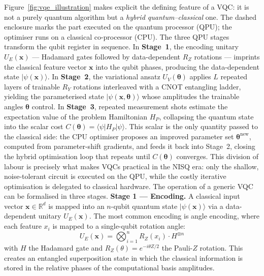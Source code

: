 Figure~\ref{fig:vqe_illustration} makes explicit the defining feature of a VQC: it is not a purely quantum algorithm but a \emph{hybrid quantum--classical} one. The dashed enclosure marks the part executed on the quantum processor (QPU); the optimiser runs on a classical co-processor (CPU). The three QPU stages transform the qubit register in sequence. In \textbf{Stage~1}, the encoding unitary $U_E(\mathbf{x})$ --- Hadamard gates followed by data-dependent $R_Z$ rotations --- imprints the classical feature vector $\mathbf{x}$ into the qubit phases, producing the data-dependent state $|\psi(\mathbf{x})\rangle$. In \textbf{Stage~2}, the variational ansatz $U_V(\boldsymbol{\theta})$ applies $L$ repeated layers of trainable $R_Y$ rotations interleaved with a CNOT entangling ladder, yielding the parameterised state $|\psi(\mathbf{x},\boldsymbol{\theta})\rangle$ whose amplitudes the trainable angles $\boldsymbol{\theta}$ control. In \textbf{Stage~3}, repeated measurement shots estimate the expectation value of the problem Hamiltonian $H_P$, collapsing the quantum state into the scalar cost $C(\boldsymbol{\theta}) = \langle\psi|H_P|\psi\rangle$. This scalar is the only quantity passed to the classical side: the CPU optimiser proposes an improved parameter set $\boldsymbol{\theta}^{\text{new}}$, computed from parameter-shift gradients, and feeds it back into Stage~2, closing the hybrid optimisation loop that repeats until $C(\boldsymbol{\theta})$ converges. This division of labour is precisely what makes VQCs practical in the NISQ era: only the shallow, noise-tolerant circuit is executed on the QPU, while the costly iterative optimisation is delegated to classical hardware.
The operation of a generic VQC can be formalised in three stages. \textbf{Stage 1 --- Encoding.} A classical input vector $\mathbf{x} \in \mathbb{R}^d$ is mapped into an $n$-qubit quantum state $|\psi(\mathbf{x})\rangle$ via a data-dependent unitary $U_E(\mathbf{x})$. The most common encoding is angle encoding, where each feature $x_i$ is mapped to a single-qubit rotation angle:
\begin{equation}
    U_E(\mathbf{x}) = \bigotimes_{i=1}^{n} R_Z(x_i) \cdot H^{\otimes n}
    \label{eq:angle_encoding}
\end{equation}
with $H$ the Hadamard gate and $R_Z(\theta) = e^{-i\theta Z/2}$ the Pauli-$Z$ rotation. This creates an entangled superposition state in which the classical information is stored in the relative phases of the computational basis amplitudes.

